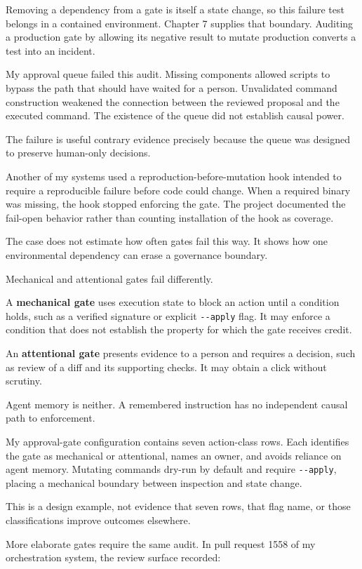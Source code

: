 Removing a dependency from a gate is itself a state change, so this failure test belongs in a contained environment. Chapter 7 supplies that boundary. Auditing a production gate by allowing its negative result to mutate production converts a test into an incident.

My approval queue failed this audit. Missing components allowed scripts to bypass the path that should have waited for a person. Unvalidated command construction weakened the connection between the reviewed proposal and the executed command. The existence of the queue did not establish causal power.

The failure is useful contrary evidence precisely because the queue was designed to preserve human-only decisions.

Another of my systems used a reproduction-before-mutation hook intended to require a reproducible failure before code could change. When a required binary was missing, the hook stopped enforcing the gate. The project documented the fail-open behavior rather than counting installation of the hook as coverage.

The case does not estimate how often gates fail this way. It shows how one environmental dependency can erase a governance boundary.

Mechanical and attentional gates fail differently.

A \textbf{mechanical gate} uses execution state to block an action until a condition holds, such as a verified signature or explicit \texttt{-\/-apply} flag. It may enforce a condition that does not establish the property for which the gate receives credit.

An \textbf{attentional gate} presents evidence to a person and requires a decision, such as review of a diff and its supporting checks. It may obtain a click without scrutiny.

Agent memory is neither. A remembered instruction has no independent causal path to enforcement.

My approval-gate configuration contains seven action-class rows. Each identifies the gate as mechanical or attentional, names an owner, and avoids reliance on agent memory. Mutating commands dry-run by default and require \texttt{-\/-apply}, placing a mechanical boundary between inspection and state change.

This is a design example, not evidence that seven rows, that flag name, or those classifications improve outcomes elsewhere.

More elaborate gates require the same audit. In pull request 1558 of my orchestration system, the review surface recorded:

